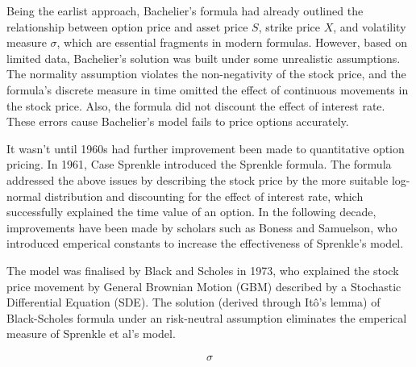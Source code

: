 Being the earlist approach, Bachelier's formula had already outlined the relationship between option price and asset price $S$, strike price $X$, and volatility measure $\sigma$, which are essential fragments in modern formulas. However, based on limited data, Bachelier's solution was built under some unrealistic assumptions. The normality assumption violates the non-negativity of the stock price, and the formula's discrete measure in time omitted the effect of continuous movements in the stock price. Also, the formula did not discount the effect of interest rate. These errors cause Bachelier's model fails to price options accurately.

It wasn't until 1960s had further improvement been made to quantitative option pricing. In 1961, Case Sprenkle \cite{Sprenkle1961} introduced the Sprenkle formula. The formula addressed the above issues by describing the stock price by the more suitable log-normal distribution and discounting for the effect of interest rate, which successfully explained the time value of an option. In the following decade, improvements have been made by scholars such as Boness and Samuelson, who introduced emperical constants to increase the effectiveness of Sprenkle's model.

The model was finalised by Black and Scholes in 1973, who explained the stock price movement by General Brownian Motion (GBM) described by a Stochastic Differential Equation (SDE). The solution (derived through Itô's lemma) of Black-Scholes formula under an risk-neutral assumption eliminates the emperical measure of Sprenkle et al's model.



\cite{BS1973}

\cite{CRR1979}

\begin{align}
\sigma 
\end{align}



\newpage